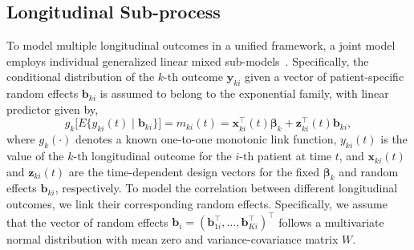 \documentclass[AMA,STIX1COL]{WileyNJD-v2}
\begin{document}
\subsection{Longitudinal Sub-process}
To model multiple longitudinal outcomes in a unified framework, a joint model employs individual generalized linear mixed sub-models~\citep{mcculloch2005generalized}. Specifically, the conditional distribution of the $k$-th outcome $\boldsymbol{y}_{ki}$ given a vector of patient-specific random effects $\boldsymbol{b}_{ki}$ is assumed to belong to the exponential family, with linear predictor given by,
\begin{equation*}
\label{eq:long_model}
g_k\big[E\{y_{ki} (t) \mid \boldsymbol{b}_{ki}\}\big] = m_{ki}(t) = \boldsymbol{x}_{ki}^{\top}(t)\boldsymbol{\beta}_{k} + \boldsymbol{z}_{ki}^{\top}(t)\boldsymbol{b}_{ki},
\end{equation*}
where $g_k(\cdot)$ denotes a known one-to-one monotonic link function, $y_{ki}(t)$ is the
value of the ${k\mbox{-th}}$ longitudinal outcome for the ${i\mbox{-th}}$ patient at time $t$, and $\boldsymbol{x}_{ki}(t)$ and $\boldsymbol{z}_{ki}(t)$ are the time-dependent design vectors for the fixed $\boldsymbol{\beta}_{k}$ and random effects $\boldsymbol{b}_{ki}$, respectively. To model the correlation between different longitudinal outcomes, we link their corresponding random effects. Specifically, we assume that the vector of random effects ${\boldsymbol{b}_{i} = (\boldsymbol{b}_{1i}^{\top}, \ldots, \boldsymbol{b}_{Ki}^{\top})^{\top}}$ follows a multivariate normal distribution with mean zero and variance-covariance matrix $W$.
\end{document}
